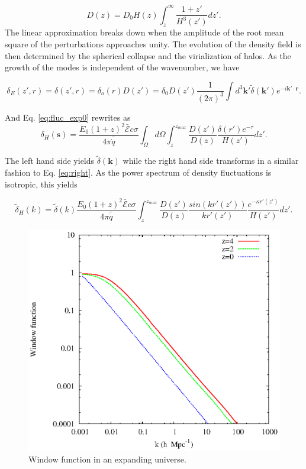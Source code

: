 \documentclass[twocolumns]{emulateapj}
\begin{document}
\begin{equation}
  \label{eq:growth_1}
  D(z)=D_0H(z)\int_z^{\infty}\frac{1+z'}{H^3(z')}dz'.
\end{equation}
The linear approximation breaks down when the amplitude of the root mean square of the perturbations approaches unity. The evolution of the density field is then determined by the spherical collapse \citep{1972ApJ...176....1G} and the virialization of halos. As the growth of the modes is independent of the wavenumber, we have

\begin{equation}
  \label{eq:FT_delta}
  \delta_E(z',r)=\delta(z',r)=\delta_o(r)D(z')=\delta_0D(z')\frac{1}{(2\pi)^3}\int d^3\mathbf{k'} \tilde{\delta}(\mathbf{k'}) e^{-i\mathbf{k'}\cdot\mathbf{r}}.
\end{equation}


And Eq. \ref{eq:fluc_exp0}  rewrites as
\begin{equation}
  \label{eq:heat_fluc_exp0}
  \delta_H(\mathbf{s})=\frac{ E_0(1+z)^2 \bar{\mathcal{E}} c\sigma}{4\pi\bar{\dot{q}}} \int_{\Omega}d\Omega\int_z^{z_{max}}  \frac{D(z')}{D(z)} \frac{\delta(r') e^{-\tau}}{H(z')}dz'.
\end{equation}


The left hand side yields $\tilde{\delta}(\mathbf{k})$ while the right hand side transforms in a similar fashion to Eq. \ref{eq:right}. As the power spectrum of density fluctuations is isotropic, this  yields

\begin{equation}
  \label{eq:heat_fluc_exp1}
  \tilde{\delta}_H(k)=\tilde{\delta}(k) \frac{E_0(1+z)^2\bar{\mathcal{E}}c\sigma}{4\pi\bar{\dot{q}}} \int_z^{z_{max}} \frac{D(z')}{D(z)}\frac{sin(kr'(z'))}{kr'(z')}    \frac{e^{-\kappa r'(z')}} {H(z')}  dz'.
\end{equation}

\begin{figure}[h]
  \centering
  \includegraphics[width = .45\textwidth ]{window_nobiases}
  \caption{Window function in an expanding universe.}
  \label{fig:window_nobiases}
\end{figure}
\end{document}
